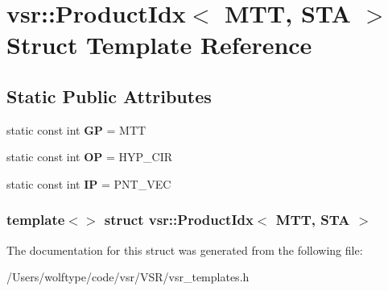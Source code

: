 \hypertarget{structvsr_1_1_product_idx_3_01_m_t_t_00_01_s_t_a_01_4}{\section{vsr\-:\-:Product\-Idx$<$ M\-T\-T, S\-T\-A $>$ Struct Template Reference}
\label{structvsr_1_1_product_idx_3_01_m_t_t_00_01_s_t_a_01_4}
}
\subsection*{Static Public Attributes}
\begin{DoxyCompactItemize}
\item 
\hypertarget{structvsr_1_1_product_idx_3_01_m_t_t_00_01_s_t_a_01_4_a7186b0c08ba4ee50bae6ce96fb0e130c}{static const int {\bfseries G\-P} = M\-T\-T}\label{structvsr_1_1_product_idx_3_01_m_t_t_00_01_s_t_a_01_4_a7186b0c08ba4ee50bae6ce96fb0e130c}

\item 
\hypertarget{structvsr_1_1_product_idx_3_01_m_t_t_00_01_s_t_a_01_4_a6388b83f7c9d0602d3914ba740101057}{static const int {\bfseries O\-P} = H\-Y\-P\-\_\-\-C\-I\-R}\label{structvsr_1_1_product_idx_3_01_m_t_t_00_01_s_t_a_01_4_a6388b83f7c9d0602d3914ba740101057}

\item 
\hypertarget{structvsr_1_1_product_idx_3_01_m_t_t_00_01_s_t_a_01_4_ae738832e52efa2487656dd8eead9b6e6}{static const int {\bfseries I\-P} = P\-N\-T\-\_\-\-V\-E\-C}\label{structvsr_1_1_product_idx_3_01_m_t_t_00_01_s_t_a_01_4_ae738832e52efa2487656dd8eead9b6e6}

\end{DoxyCompactItemize}
\subsubsection*{template$<$$>$ struct vsr\-::\-Product\-Idx$<$ M\-T\-T, S\-T\-A $>$}



The documentation for this struct was generated from the following file\-:\begin{DoxyCompactItemize}
\item 
/\-Users/wolftype/code/vsr/\-V\-S\-R/vsr\-\_\-templates.\-h\end{DoxyCompactItemize}
